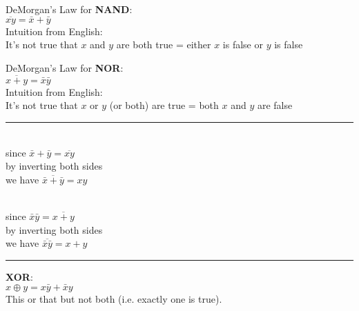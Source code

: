 \documentclass{article}
\begin{document}
\huge

\noindent DeMorgan's Law for \textbf{NAND}:\\
$\overline{xy} = \bar{x} + \bar{y}$\\
{\large Intuition from English:\vspace{-.125in}\\It's not true that $x$ and $y$ are both true = either $x$ is false or $y$ is false}
\vspace{0.25in}

\noindent DeMorgan's Law for \textbf{NOR}:\\
$\overline{x + y} = \bar{x}\bar{y}$\\
{\large Intuition from English:\vspace{-.125in}\\It's not true that $x$ or $y$ (or both) are true = both $x$ and $y$ are false}


\vspace{0.25in}\hrule\vspace{.25in}

\noindent {}\\
{\large since \phantom{we have}}$\bar{x} + \bar{y} = \overline{xy}$\\
{\large by inverting both sides}\\
{\large we have \phantom{since}}$\overline{\bar{x} + \bar{y}} = xy$
\vspace{0.25in}

\noindent {}\\
{\large since \phantom{we have}}$\bar{x}\bar{y} = \overline{x + y}$\\
{\large by inverting both sides}\\
{\large we have \phantom{since}}$\overline{\bar{x}\bar{y}} = x + y$

\vspace{0.25in}\hrule\vspace{.25in}

\noindent \textbf{XOR}:\\
$x \oplus y = x\bar{y} + \bar{x}y$\\
{\large This or that but not both (i.e. exactly one is true).}
\vspace{0.25in}
\end{document}
